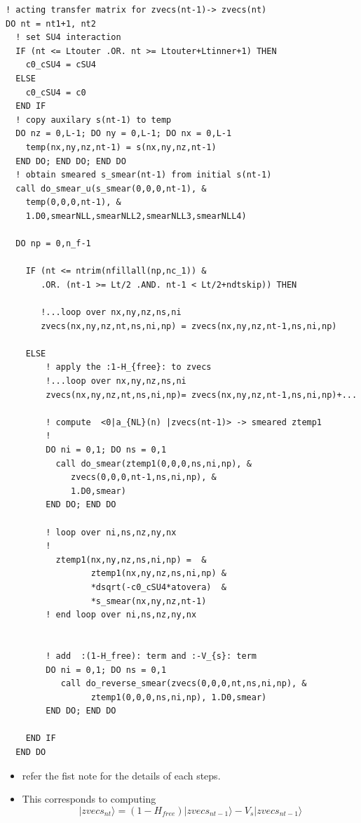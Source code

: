 \documentclass[10pt]{book}
\def\ra{\rangle}
\begin{document}
\begin{lstlisting}[frame=single]
! acting transfer matrix for zvecs(nt-1)-> zvecs(nt) 
DO nt = nt1+1, nt2
  ! set SU4 interaction 
  IF (nt <= Ltouter .OR. nt >= Ltouter+Ltinner+1) THEN
    c0_cSU4 = cSU4
  ELSE
    c0_cSU4 = c0
  END IF
  ! copy auxilary s(nt-1) to temp 
  DO nz = 0,L-1; DO ny = 0,L-1; DO nx = 0,L-1
    temp(nx,ny,nz,nt-1) = s(nx,ny,nz,nt-1)
  END DO; END DO; END DO
  ! obtain smeared s_smear(nt-1) from initial s(nt-1)
  call do_smear_u(s_smear(0,0,0,nt-1), &
    temp(0,0,0,nt-1), &
    1.D0,smearNLL,smearNLL2,smearNLL3,smearNLL4)

  DO np = 0,n_f-1

    IF (nt <= ntrim(nfillall(np,nc_1)) &
       .OR. (nt-1 >= Lt/2 .AND. nt-1 < Lt/2+ndtskip)) THEN

       !...loop over nx,ny,nz,ns,ni
       zvecs(nx,ny,nz,nt,ns,ni,np) = zvecs(nx,ny,nz,nt-1,ns,ni,np)

    ELSE
        ! apply the :1-H_{free}: to zvecs 
        !...loop over nx,ny,nz,ns,ni
        zvecs(nx,ny,nz,nt,ns,ni,np)= zvecs(nx,ny,nz,nt-1,ns,ni,np)+... 
        
        ! compute  <0|a_{NL}(n) |zvecs(nt-1)> -> smeared ztemp1 
        !
        DO ni = 0,1; DO ns = 0,1
          call do_smear(ztemp1(0,0,0,ns,ni,np), &
             zvecs(0,0,0,nt-1,ns,ni,np), &
             1.D0,smear)
        END DO; END DO

        ! loop over ni,ns,nz,ny,nx
        !  
          ztemp1(nx,ny,nz,ns,ni,np) =  &
                 ztemp1(nx,ny,nz,ns,ni,np) &
                 *dsqrt(-c0_cSU4*atovera)  &
                 *s_smear(nx,ny,nz,nt-1)
        ! end loop over ni,ns,nz,ny,nx
        

        ! add  :(1-H_free): term and :-V_{s}: term 
        DO ni = 0,1; DO ns = 0,1
           call do_reverse_smear(zvecs(0,0,0,nt,ns,ni,np), &
                 ztemp1(0,0,0,ns,ni,np), 1.D0,smear)
        END DO; END DO

    END IF
  END DO
\end{lstlisting}
\begin{itemize}
	\item refer the fist note for the details of each steps.
	\item This corresponds to computing 
	 $$|zvecs_{nt}\ra= (1-H_{free})|zvecs_{nt-1}\ra -V_s|zvecs_{nt-1}\ra$$
\end{itemize}
\end{document}
